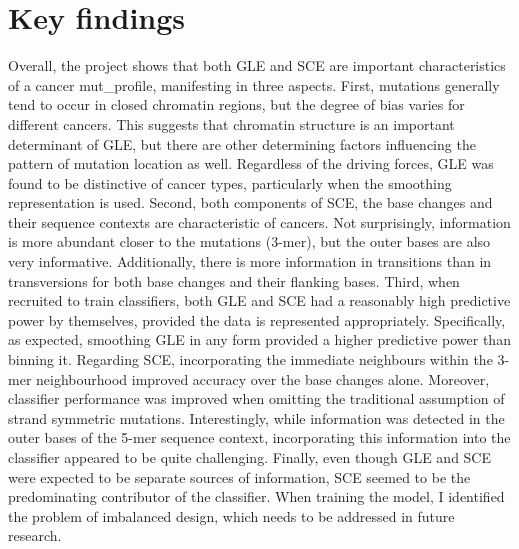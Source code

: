 \section{Key findings}
\label{intro:findings}
Overall, the project shows that both GLE and SCE are important characteristics of a cancer \gls{mut_profile}, manifesting in three aspects. First, mutations generally tend to occur in closed chromatin regions, but the degree of bias varies for different cancers. This suggests that chromatin structure is an important determinant of GLE, but there are other determining factors influencing the pattern of mutation location as well. Regardless of the driving forces, GLE was found to be distinctive of cancer types, particularly when the smoothing representation is used. Second, both components of SCE, the base changes and their sequence contexts are characteristic of cancers. Not surprisingly, information is more abundant closer to the mutations (3-mer), but the outer bases are also very informative. Additionally, there is more information in \glspl{transition} than in \glspl{transversion} for both base changes and their flanking bases. Third, when recruited to train classifiers, both GLE and SCE had a reasonably high predictive power by themselves, provided the data is represented appropriately. Specifically, as expected, smoothing GLE in any form provided a higher predictive power than binning it. Regarding SCE, incorporating the immediate neighbours within the 3-mer neighbourhood improved accuracy over the base changes alone. Moreover, classifier performance was improved when omitting the traditional assumption of strand symmetric mutations. Interestingly, while information was detected in the outer bases of the 5-mer sequence context, incorporating this information into the classifier appeared to be quite challenging. Finally, even though GLE and SCE were expected to be separate sources of information, SCE seemed to be the predominating contributor of the classifier. When training the model, I identified the problem of imbalanced design, which needs to be addressed in future research.   

